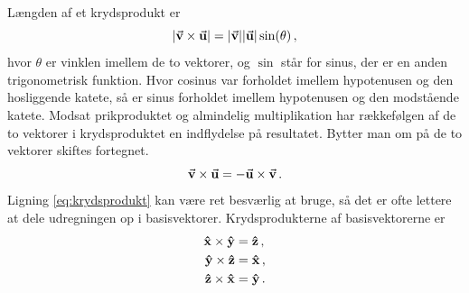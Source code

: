 \noindent Længden af et krydsprodukt er
\begin{equation}
    \abs{\va v \times \va u}=\abs{\va v}\abs{\va u}\sin(\theta) \, ,
\end{equation}
hvor $\theta$ er vinklen imellem de to vektorer, og $\sin$ står for sinus, der er en anden trigonometrisk funktion. Hvor cosinus var forholdet imellem hypotenusen og den hosliggende katete, så er sinus forholdet imellem hypotenusen og den modstående katete.
Modsat prikproduktet og almindelig multiplikation har rækkefølgen af de to vektorer i krydsproduktet en indflydelse på resultatet. Bytter man om på de to vektorer skiftes fortegnet.
\begin{equation}\label{eq:krydskommutator}
    \va v \times \va u=-\va u\times \va v \, .
\end{equation}
Ligning \eqref{eq:krydsprodukt} kan være ret besværlig at bruge, så det er ofte lettere at dele udregningen op i basisvektorer. Krydsprodukterne af basisvektorerne er
\begin{subequations}
\begin{align}
    \vu x\times\vu y&=\vu z \, ,\\
    \vu y\times\vu z&=\vu x \, ,\\
    \vu z\times\vu x&=\vu y \, .
\end{align}
\end{subequations}

\newpage

